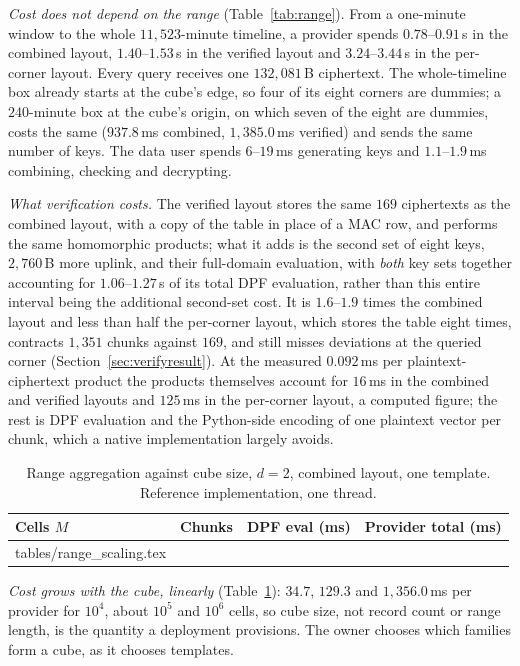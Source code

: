 \documentclass[a4paper,fleqn]{cas-sc}
\begin{document}
\emph{Cost does not depend on the range} (Table~\ref{tab:range}). From a
one-minute window to the whole $11{,}523$-minute timeline, a provider spends
$0.78$--$0.91$\,s in the combined layout, $1.40$--$1.53$\,s in the verified
layout and $3.24$--$3.44$\,s in the per-corner layout. Every query receives one
$132{,}081$\,B ciphertext. The whole-timeline box already starts at the cube's
edge, so four of its eight corners are dummies; a $240$-minute box at the
cube's origin, on which seven of the eight are dummies, costs the same
($937.8$\,ms combined, $1{,}385.0$\,ms verified) and sends the same number of
keys. The data user spends $6$--$19$\,ms generating keys and $1.1$--$1.9$\,ms
combining, checking and decrypting.

\emph{What verification costs.} The verified layout stores the same $169$
ciphertexts as the combined layout, with a copy of the table in place of a MAC
row, and performs the same homomorphic products; what it adds is the second
set of eight keys, $2{,}760$\,B more uplink, and their full-domain evaluation,
with \emph{both} key sets together accounting for $1.06$--$1.27$\,s
of its total DPF evaluation, rather than this entire interval being the
additional second-set cost. It is $1.6$--$1.9$ times
the combined layout and less than half the per-corner layout, which stores the
table eight times, contracts $1{,}351$ chunks against $169$, and still misses
deviations at the queried corner (Section~\ref{sec:verifyresult}). At the
measured $0.092$\,ms per plaintext-ciphertext product the products themselves
account for $16$\,ms in the combined and verified layouts and $125$\,ms in the
per-corner layout, a computed figure; the rest is DPF evaluation and the
Python-side encoding of one plaintext vector per chunk, which a native
implementation largely avoids.

\begin{table}[pos=htbp]
\caption{Range aggregation against cube size, $d=2$, combined layout, one
template. Reference implementation, one thread.}
\label{tab:rangescale}
\centering
\footnotesize
\begin{tabular*}{\tblwidth}{@{\extracolsep{\fill}}lccc@{}}
\toprule
Cells $M$ & Chunks & DPF eval (ms) & Provider total (ms) \\
\midrule
{} tables/range_scaling.tex 
\bottomrule
\end{tabular*}
\end{table}

\emph{Cost grows with the cube, linearly} (Table~\ref{tab:rangescale}): $34.7$,
$129.3$ and $1{,}356.0$\,ms per provider for $10^4$, about $10^5$ and $10^6$
cells, so cube size, not record count or range length, is the quantity a
deployment provisions. The owner chooses which families form a cube, as it
chooses templates.
\end{document}
